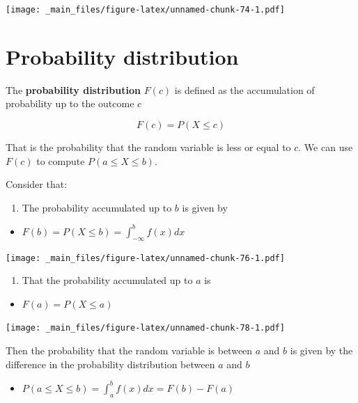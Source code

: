 \documentclass[
]{book}
\providecommand{\tightlist}{%
  \setlength{\itemsep}{0pt}\setlength{\parskip}{0pt}}
\begin{document}
\texttt{[image: \_main\_files/figure-latex/unnamed-chunk-74-1.pdf]}

\hypertarget{probability-distribution-1}{%
\section{Probability distribution}\label{probability-distribution-1}}

The \textbf{probability distribution} \(F(c)\) is defined as the accumulation of probability up to the outcome \(c\)

\[F(c) = P(X \leq c)\]

That is the probability that the random variable is less or equal to \(c\). We can use \(F(c)\) to compute \(P(a \leq X \leq b)\).

Consider that:

\begin{enumerate}
\def\labelenumi{\arabic{enumi})}
\tightlist
\item
  The probability accumulated up to \(b\) is given by
\end{enumerate}

\begin{itemize}
\tightlist
\item
  \(F(b) = P(X \leq b)=\int_{-\infty}^bf(x)dx\)
\end{itemize}

\texttt{[image: \_main\_files/figure-latex/unnamed-chunk-76-1.pdf]}

\begin{enumerate}
\def\labelenumi{\arabic{enumi})}
\setcounter{enumi}{1}
\tightlist
\item
  That the probability accumulated up to \(a\) is
\end{enumerate}

\begin{itemize}
\tightlist
\item
  \(F(a) = P(X \leq a)\)
\end{itemize}

\texttt{[image: \_main\_files/figure-latex/unnamed-chunk-78-1.pdf]}

Then the probability that the random variable is between \(a\) and \(b\) is given by the difference in the probability distribution between \(a\) and \(b\)

\begin{itemize}
\tightlist
\item
  \(P(a\leq X \leq b) = \int_a^b f(x)dx=F(b)-F(a)\)
\end{itemize}
\end{document}
